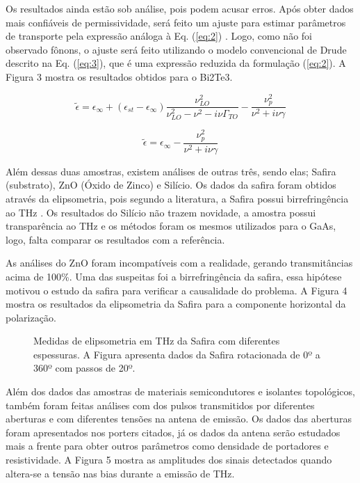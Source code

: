 \documentclass[a4paper,12pt,oneside]{article}
\begin{document}
Os resultados ainda estão sob análise, pois podem acusar erros. Após obter dados mais confiáveis de permissividade, será feito um ajuste para estimar parâmetros de transporte pela expressão análoga à Eq. (\ref{eq:2}) \cite{Fox2010, Kawahala2023}. Logo, como não foi observado fônons, o ajuste será feito utilizando o modelo convencional de Drude descrito na Eq. (\ref{eq:3}), que é uma expressão reduzida da formulação (\ref{eq:2}). A Figura 3 mostra os resultados obtidos para o Bi2Te3.

\begin{equation}
    \widetilde{\epsilon} = \epsilon_{\infty} + (\epsilon_{st} - \epsilon_{\infty})\frac{\nu_{LO}^{2}}{\nu_{LO}^{2} - \nu^{2} - i\nu \Gamma_{TO}} - \frac{\nu_{p}^{2}}{\nu^{2} + i\nu \gamma}
    \label{eq:2}
\end{equation}

\begin{equation}
    \widetilde{\epsilon} = \epsilon_{\infty} - \frac{\nu_{p}^{2}}{\nu^{2} + i\nu \gamma}
    \label{eq:3}
\end{equation}

Além dessas duas amostras, existem análises de outras três, sendo elas; Safira (substrato), ZnO (Óxido de Zinco) e Silício. Os dados da safira foram obtidos através da elipsometria, pois segundo a literatura, a Safira possui birrefringência ao THz \cite{Lee2009}. Os resultados do Silício não trazem novidade, a amostra possui transparência ao THz e os métodos foram os mesmos utilizados para o GaAs, logo, falta comparar os resultados com a referência.

As análises do ZnO foram incompatíveis com a realidade, gerando transmitâncias acima de 100\%. Uma das suspeitas foi a birrefringência da safira, essa hipótese motivou o estudo da safira para verificar a causalidade do problema. A Figura 4 mostra os resultados da elipsometria da Safira para a componente horizontal da polarização.

\begin{figure}[ht]
  \centering
  \caption{Medidas de elipsometria em THz da Safira com diferentes espessuras. A Figura apresenta dados da Safira rotacionada de 0º a 360º com passos de 20º.}
  \label{fig:4}
\end{figure}

Além dos dados das amostras de materiais semicondutores e isolantes topológicos, também foram feitas análises com dos pulsos transmitidos por diferentes aberturas e com diferentes tensões na antena de emissão. Os dados das aberturas foram apresentados nos porters citados, já os dados da antena serão estudados mais a frente para obter outros parâmetros como densidade de portadores e resistividade. A Figura 5 mostra as amplitudes dos sinais detectados quando altera-se a tensão nas bias durante a emissão de THz.
\end{document}
